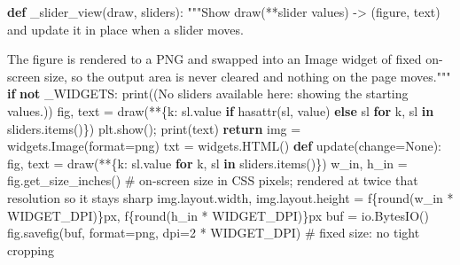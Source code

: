 \documentclass[
  letterpaper,
  DIV=11,
  numbers=noendperiod]{scrreprt}
\newenvironment{Shaded}{\begin{snugshade}}{\end{snugshade}}
\newcommand{\BuiltInTok}[1]{\textcolor[rgb]{0.00,0.23,0.31}{#1}}
\newcommand{\CommentTok}[1]{\textcolor[rgb]{0.37,0.37,0.37}{#1}}
\newcommand{\ControlFlowTok}[1]{\textcolor[rgb]{0.00,0.23,0.31}{\textbf{#1}}}
\newcommand{\DecValTok}[1]{\textcolor[rgb]{0.68,0.00,0.00}{#1}}
\newcommand{\KeywordTok}[1]{\textcolor[rgb]{0.00,0.23,0.31}{\textbf{#1}}}
\newcommand{\NormalTok}[1]{\textcolor[rgb]{0.00,0.23,0.31}{#1}}
\newcommand{\OperatorTok}[1]{\textcolor[rgb]{0.37,0.37,0.37}{#1}}
\newcommand{\SpecialCharTok}[1]{\textcolor[rgb]{0.37,0.37,0.37}{#1}}
\newcommand{\SpecialStringTok}[1]{\textcolor[rgb]{0.13,0.47,0.30}{#1}}
\newcommand{\StringTok}[1]{\textcolor[rgb]{0.13,0.47,0.30}{#1}}
\newcommand{\VariableTok}[1]{\textcolor[rgb]{0.07,0.07,0.07}{#1}}
\theoremstyle{plain}
\theoremstyle{plain}
\theoremstyle{definition}
\theoremstyle{definition}
\theoremstyle{definition}
\theoremstyle{plain}
\theoremstyle{plain}
\theoremstyle{remark}
\begin{document}
\begin{Shaded}
\begin{Highlighting}[]
\KeywordTok{def}\NormalTok{ \_slider\_view(draw, sliders):}
    \CommentTok{"""Show draw(**slider values) {-}\textgreater{} (figure, text) and update it in place when a slider moves.}

\CommentTok{    The figure is rendered to a PNG and swapped into an Image widget of fixed on{-}screen size,}
\CommentTok{    so the output area is never cleared and nothing on the page moves."""}
    \ControlFlowTok{if} \KeywordTok{not}\NormalTok{ \_WIDGETS:}
        \BuiltInTok{print}\NormalTok{(}\StringTok{\textquotesingle{}(No sliders available here: showing the starting values.)\textquotesingle{}}\NormalTok{)}
\NormalTok{        fig, text }\OperatorTok{=}\NormalTok{ draw(}\OperatorTok{**}\NormalTok{\{k: sl.value }\ControlFlowTok{if} \BuiltInTok{hasattr}\NormalTok{(sl, }\StringTok{\textquotesingle{}value\textquotesingle{}}\NormalTok{) }\ControlFlowTok{else}\NormalTok{ sl }\ControlFlowTok{for}\NormalTok{ k, sl }\KeywordTok{in}\NormalTok{ sliders.items()\})}
\NormalTok{        plt.show()}\OperatorTok{;} \BuiltInTok{print}\NormalTok{(text)}
        \ControlFlowTok{return}
\NormalTok{    img }\OperatorTok{=}\NormalTok{ widgets.Image(}\BuiltInTok{format}\OperatorTok{=}\StringTok{\textquotesingle{}png\textquotesingle{}}\NormalTok{)}
\NormalTok{    txt }\OperatorTok{=}\NormalTok{ widgets.HTML()}
    \KeywordTok{def}\NormalTok{ update(change}\OperatorTok{=}\VariableTok{None}\NormalTok{):}
\NormalTok{        fig, text }\OperatorTok{=}\NormalTok{ draw(}\OperatorTok{**}\NormalTok{\{k: sl.value }\ControlFlowTok{for}\NormalTok{ k, sl }\KeywordTok{in}\NormalTok{ sliders.items()\})}
\NormalTok{        w\_in, h\_in }\OperatorTok{=}\NormalTok{ fig.get\_size\_inches()}
        \CommentTok{\# on{-}screen size in CSS pixels; rendered at twice that resolution so it stays sharp}
\NormalTok{        img.layout.width, img.layout.height }\OperatorTok{=} \SpecialStringTok{f\textquotesingle{}}\SpecialCharTok{\{}\BuiltInTok{round}\NormalTok{(w\_in }\OperatorTok{*}\NormalTok{ WIDGET\_DPI)}\SpecialCharTok{\}}\SpecialStringTok{px\textquotesingle{}}\NormalTok{, }\SpecialStringTok{f\textquotesingle{}}\SpecialCharTok{\{}\BuiltInTok{round}\NormalTok{(h\_in }\OperatorTok{*}\NormalTok{ WIDGET\_DPI)}\SpecialCharTok{\}}\SpecialStringTok{px\textquotesingle{}}
\NormalTok{        buf }\OperatorTok{=}\NormalTok{ io.BytesIO()}
\NormalTok{        fig.savefig(buf, }\BuiltInTok{format}\OperatorTok{=}\StringTok{\textquotesingle{}png\textquotesingle{}}\NormalTok{, dpi}\OperatorTok{=}\DecValTok{2} \OperatorTok{*}\NormalTok{ WIDGET\_DPI)   }\CommentTok{\# fixed size: no \textquotesingle{}tight\textquotesingle{} cropping}

\end{Highlighting}
\end{Shaded}
\end{document}
